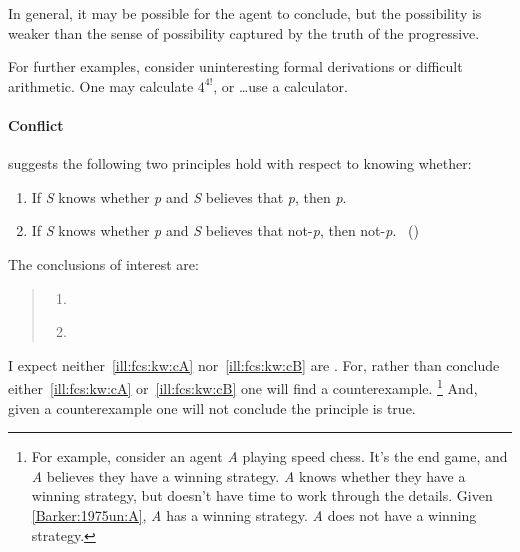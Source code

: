 \begin{note}
  In general, it may be possible for the agent to conclude, but the possibility is weaker than the sense of possibility captured by the truth of the progressive.

  For further examples, consider uninteresting formal derivations or difficult arithmetic.
  One may calculate \(4^{4!}\), or \dots\space use a calculator.
\end{note}

\paragraph*{Conflict}

\begin{note}

  \begin{scenario}%
    \label{ill:fcs:kw}%
    \citeauthor{Barker:1975un} suggests the following two principles hold with respect to knowing whether:

    \begin{enumerate}[label=(\Alph*), ref=(\Alph*), noitemsep]
    \item
      \label{Barker:1975un:A}
      If \emph{S} knows whether \emph{p} and \emph{S} believes that \emph{p}, then \emph{p}.
    \item
      \label{Barker:1975un:B}
      If \emph{S} knows whether \emph{p} and \emph{S} believes that not-\emph{p}, then not-\emph{p}.%
      \mbox{ }\hfill\mbox{(\citeyear[281]{Barker:1975un})}
    \end{enumerate}
  \end{scenario}

  \noindent The conclusions of interest are:

  \begin{quote}
  \begin{enumerate}[label=C\thescenarioCounter\Alph*., ref=(C\thescenarioCounter\Alph*), noitemsep]
  \item
    \label{ill:fcs:kw:cA}
  \item
    \label{ill:fcs:kw:cB}
  \end{enumerate}
\end{quote}

  \noindent I expect neither~\ref{ill:fcs:kw:cA} nor~\ref{ill:fcs:kw:cB} are .
  For, rather than conclude either~\ref{ill:fcs:kw:cA} or~\ref{ill:fcs:kw:cB} one will find a counterexample.%
  \footnote{
    For example, consider an agent \emph{A} playing speed chess.
    It's the end game, and \emph{A} believes they have a winning strategy.
    \emph{A} knows whether they have a winning strategy, but doesn't have time to work through the details.
    Given \ref{Barker:1975un:A}, \emph{A} has a winning strategy.
    \emph{A} does not have a winning strategy.
  }
  And, given a counterexample one will not conclude the principle is true.
\end{note}

